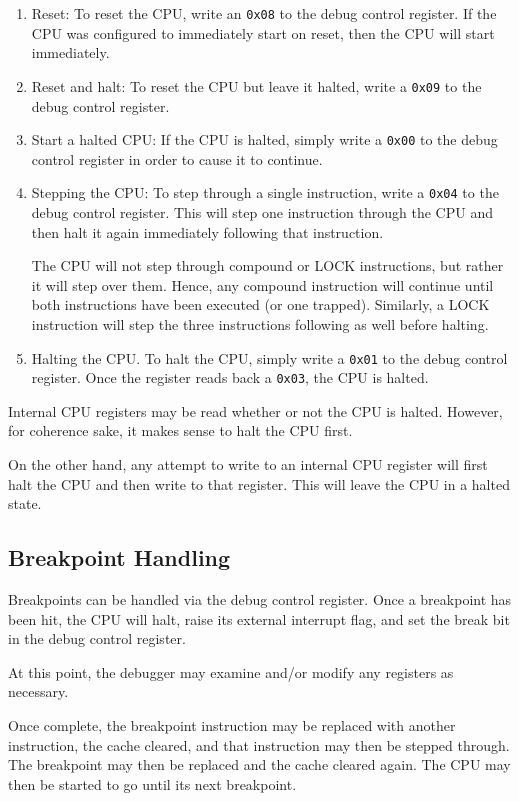 \documentclass{gqtekspec}
\begin{document}
\begin{enumerate}
\item Reset: To reset the CPU, write an {\tt 0x08} to the debug control
	register.  If the CPU was configured to immediately start on reset,
	then the CPU will start immediately.
\item Reset and halt: To reset the CPU but leave it halted, write a
	{\tt 0x09} to the debug control register.
\item Start a halted CPU: If the CPU is halted, simply write a {\tt 0x00} to the
	debug control register in order to cause it to continue.
\item Stepping the CPU: To step through a single instruction, write a
	{\tt 0x04} to the debug control register.  This will step one
	instruction through the CPU and then halt it again immediately
	following that instruction.

	The CPU will not step through compound or LOCK instructions, but rather
	it will step over them.  Hence, any compound instruction will continue
	until both instructions have been executed (or one trapped).  Similarly,
	a LOCK instruction will step the three instructions following as well
	before halting.
\item Halting the CPU.  To halt the CPU, simply write a {\tt 0x01} to the
	debug control register.  Once the register reads back a {\tt 0x03}, the
	CPU is halted.
\end{enumerate}

Internal CPU registers may be read whether or not the CPU is halted.  However,
for coherence sake, it makes sense to halt the CPU first.

On the other hand, any attempt to write to an internal CPU register will first
halt the CPU and then write to that register.  This will leave the CPU in a
halted state.

\subsection{Breakpoint Handling}

Breakpoints can be handled via the debug control register.  Once a breakpoint
has been hit, the CPU will halt, raise its external interrupt flag, and
set the break bit in the debug control register.

At this point, the debugger may examine and/or modify any registers as
necessary.

Once complete, the breakpoint instruction may be replaced with another
instruction, the cache cleared, and that instruction may then be stepped
through.  The breakpoint may then be replaced and the cache cleared again.
The CPU may then be started to go until its next breakpoint.
\end{document}
